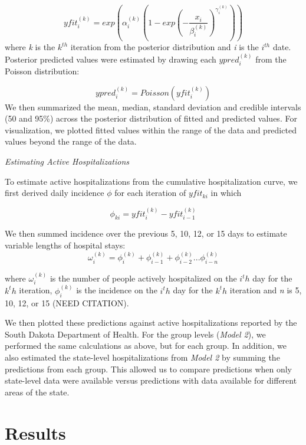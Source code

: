 \documentclass[
]{article}
\begin{document}
\[yfit_i^{(k)} = exp(\alpha_i^{(k)}(1 - exp(-\frac{x_i}{\beta_i^{(k)}})^{\gamma_i^{(k)}}))\]
where \emph{k} is the \(k^{th}\) iteration from the posterior distribution and \emph{i} is the \(i^{th}\) date. Posterior predicted values were estimated by drawing each \(ypred_i^{(k)}\) from the Poisson distribution:

\[ypred_i^{(k)} = Poisson(yfit_i^{(k)})\]
We then summarized the mean, median, standard deviation and credible intervals (50 and 95\%) across the posterior distribution of fitted and predicted values. For visualization, we plotted fitted values within the range of the data and predicted values beyond the range of the data.

\emph{Estimating Active Hospitalizations}

To estimate active hospitalizations from the cumulative hospitalization curve, we first derived daily incidence \(\phi\) for each iteration of \(yfit_{ki}\) in which

\[\phi_{ki} = yfit_i^{(k)} - yfit_{i-1}^{(k)}\]

We then summed incidence over the previous 5, 10, 12, or 15 days to estimate variable lengths of hospital stays:
\[\omega_i^{(k)} = \phi_i^{(k)} + \phi_{i-1}^{(k)} + \phi_{i-2}^{(k)}...\phi_{i-n}^{(k)}\]

where \(\omega_i^{(k)}\) is the number of people actively hospitalized on the \(i^th\) day for the \(k^th\) iteration, \(\phi_i^{(k)}\) is the incidence on the \(i^th\) day for the \(k^th\) iteration and \emph{n} is 5, 10, 12, or 15 (NEED CITATION).

We then plotted these predictions against active hospitalizations reported by the South Dakota Department of Health. For the group levels (\emph{Model 2}), we performed the same calculations as above, but for each group. In addition, we also estimated the state-level hospitalizations from \emph{Model 2} by summing the predictions from each group. This allowed us to compare predictions when only state-level data were available versus predictions with data available for different areas of the state.

\hypertarget{results}{%
\section{Results}\label{results}}
\end{document}
